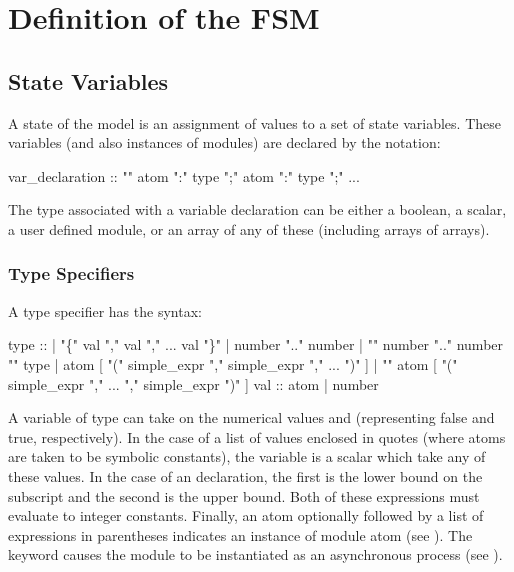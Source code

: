 \section{Definition of the FSM}
\subsection{State Variables}
\label{state variables}
%
A state of the model is an assignment of values to a set of state
variables. These variables (and also instances of modules) are
declared by the notation:
%
\begin{Grammar}
var_declaration :: ""
             atom ":" type ";"
             atom ":" type ";"
             ...
\end{Grammar}
%
The type associated with a variable declaration can be either a
boolean, a scalar, a user defined module, or an array of any of these
(including arrays of arrays).

\subsubsection{Type Specifiers}
\label{type specifiers}
%
A type specifier has the syntax:
%
\begin{Grammar}
type :: 
     |  "\{" val "," val "," ... val "\}"
     |  number ".." number
     |  "" number ".." number "" type
     |  atom [ "(" simple_expr "," simple_expr "," ...  ")" ]
     |  "" atom [ "(" simple_expr "," ... "," simple_expr ")" ]
val  :: atom
     |  number
\end{Grammar}
%
A variable of type  can take on the numerical values
 and  (representing false and true, respectively). In
the case of a list of values enclosed in quotes (where atoms are taken
to be symbolic constants), the variable is a scalar which take any of
these values. In the case of an  declaration, the first
 is the lower bound on the subscript and the second
 is the upper bound. Both of these expressions must
evaluate to integer constants. Finally, an atom optionally followed by
a list of expressions in parentheses indicates an instance of module
atom (see ). The keyword causes the module
to be instantiated as an asynchronous process (see ).

